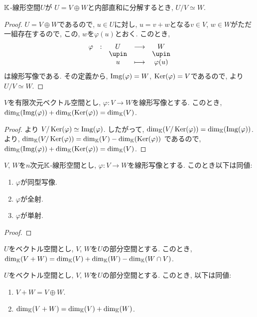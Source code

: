 \begin{cor}
$\mathbb{K}$-線形空間$U$が
$U=V\oplus W$と内部直和に分解するとき,
  $U/V\simeq W$.
\end{cor}
\begin{proof}
$U=V\oplus W$であるので,
  $u\in U$に対し,
  $u=v+w$となる$v\in V$, $w\in W$がただ一組存在するので,
  この, $w$を$\varphi(u)$とおく.
  このとき,
  \begin{align*}
    \shazo{\varphi}{U}{W}{u}{\varphi(u)}
  \end{align*}
  は線形写像である.
  その定義から, $\operatorname{Img}(\varphi)=W$, $\operatorname{Ker}(\varphi)=V$であるので,
  より $U/V\simeq W$.
\end{proof}


\begin{cor}
\label{thm:dimthm}
  $V$を有限次元ベクトル空間とし,
  $\varphi\colon V\to W$を線形写像とする.
  このとき,
  $\dim_{\mathbb{K}}(\operatorname{Img}(\varphi))+\dim_{\mathbb{K}}(\operatorname{Ker}(\varphi))=\dim_{\mathbb{K}}(V)$.
\end{cor}
\begin{proof}
  より $V/\operatorname{Ker}(\varphi) \simeq \operatorname{Img}(\varphi)$.
  したがって,
  $\dim_{\mathbb{K}}(V/\operatorname{Ker}(\varphi))=\dim_{\mathbb{K}}(\operatorname{Img}(\varphi))$.
  より,
  $\dim_{\mathbb{K}}(V/\operatorname{Ker}(\varphi))=\dim_{\mathbb{K}}(V)-\dim_{\mathbb{K}}(\operatorname{Ker}(\varphi))$
  であるので,
  $\dim_{\mathbb{K}}(\operatorname{Img}(\varphi))+\dim_{\mathbb{K}}(\operatorname{Ker}(\varphi))=\dim_{\mathbb{K}}(V)$.
\end{proof}
\begin{cor}
  $V$, $W$を$n$次元$\mathbb{K}$-線形空間とし,
  $\varphi\colon V\to W$を線形写像とする.
  このとき以下は同値:
  \begin{enumerate}
  \item $\varphi$が同型写像.
  \item $\varphi$が全射.
  \item $\varphi$が単射.
  \end{enumerate}
\end{cor}
\begin{proof}\end{proof}


\begin{prop}
  $U$をベクトル空間とし, $V$, $W$を$U$の部分空間とする.
  このとき,  $\dim_{\mathbb{K}}(V+W)=\dim_{\mathbb{K}}(V)+\dim_{\mathbb{K}}(W) - \dim_{\mathbb{K}}(W\cap V)$.
\end{prop}

\begin{cor}
  $U$をベクトル空間とし, $V$, $W$を$U$の部分空間とする.
  このとき, 以下は同値:
  \begin{enumerate}
  \item $V+W=V\oplus W$.
  \item $\dim_{\mathbb{K}}(V+W)=\dim_{\mathbb{K}}(V)+\dim_{\mathbb{K}}(W)$.
  \end{enumerate}
\end{cor}

